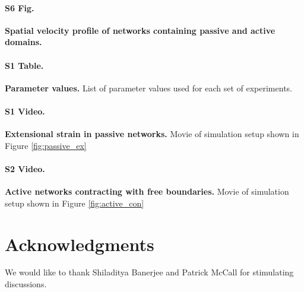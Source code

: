 \documentclass[10pt,letterpaper]{article}
\begin{document}
\paragraph*{S6 Fig.}
\label{fig:combo_prof}
{\bf Spatial velocity profile of networks containing passive and active domains.} 

\paragraph*{S1 Table.}
\label{S1_Table}
{\bf Parameter values.}  List of parameter values used for each set of experiments.

\paragraph*{S1 Video.}
\label{passive_ex_video}
{\bf Extensional strain in passive networks.}  Movie of simulation setup shown in Figure \ref{fig:passive_ex}

\paragraph*{S2 Video.}
\label{active_con_video}
{\bf Active networks contracting with free boundaries.}  Movie of simulation setup shown in Figure \ref{fig:active_con}

\section*{Acknowledgments}
We would like to thank Shiladitya Banerjee and Patrick McCall for stimulating discussions.

\nolinenumbers

% 


\end{document}
